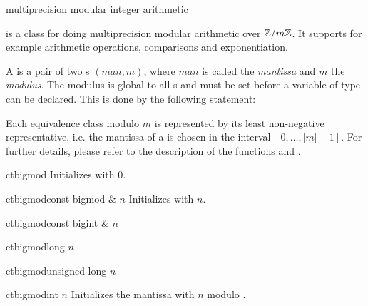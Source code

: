 


\NAME

 \dotfill multiprecision modular integer arithmetic



\ABSTRACT

 is a class for doing multiprecision modular arithmetic over $\mathbb{Z}/m\mathbb{Z}$.  It
supports for example arithmetic operations, comparisons and exponentiation.



\DESCRIPTION

A  is a pair of two s $(\mathit{man}, m)$, where $\mathit{man}$
is called the \emph{mantissa} and $m$ the \emph{modulus}.  The modulus is global to all
s and must be set before a variable of type  can be
declared.  This is done by the following statement:
\begin{quote}
\end{quote}
Each equivalence class modulo $m$ is represented by its least non-negative representative, i.e.
the mantissa of a  is chosen in the interval $[ 0, \dots, |m| - 1 ]$.  For
further details, please refer to the description of the functions  and
.



\CONS

\begin{fcode}{ct}{bigmod}{}
  Initializes with 0.
\end{fcode}

\begin{fcode}{ct}{bigmod}{const bigmod & $n$}
  Initializes with $n$.
\end{fcode}

\begin{fcode}{ct}{bigmod}{const bigint & $n$}\end{fcode}
\begin{fcode}{ct}{bigmod}{long $n$}\end{fcode}
\begin{fcode}{ct}{bigmod}{unsigned long $n$}\end{fcode}
\begin{fcode}{ct}{bigmod}{int $n$}
  Initializes the mantissa with $n$ modulo .  
\end{fcode}

